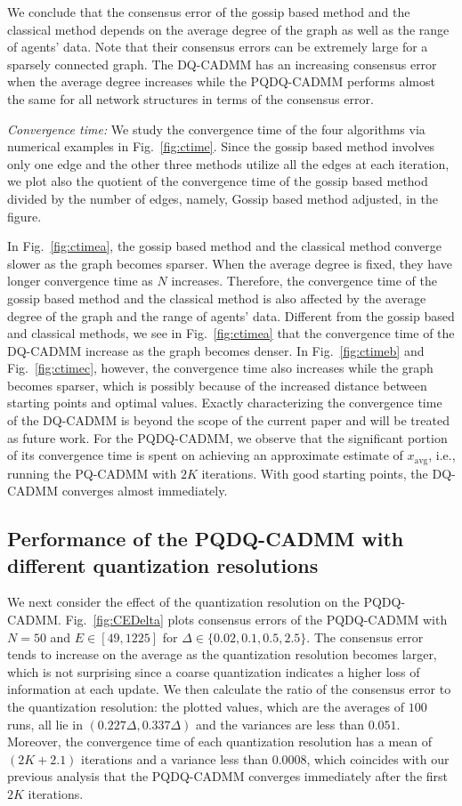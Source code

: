 \documentclass[journal]{IEEEtran}
\begin{document}
We conclude that the consensus error of the gossip based method and the classical method depends on the average degree of the graph as well as the range of agents' data. Note that their consensus errors can be extremely large for a sparsely connected graph. The DQ-CADMM has an increasing consensus error when the average degree increases while the PQDQ-CADMM performs almost the same for all network structures in terms of the consensus error. 

{\it Convergence time:} We study the convergence time of the four algorithms via numerical examples in Fig.~\ref{fig:ctime}. Since the gossip based method involves only one edge and the other three methods utilize all the edges at each iteration, we plot also the quotient of the convergence time of the gossip based method divided by the number of edges, namely, Gossip based method adjusted, in the figure. 

In Fig.~\ref{fig:ctimea}, the gossip based method and the classical method converge slower as the graph becomes sparser. When the average degree is fixed, they have longer convergence time as $N$ increases. Therefore, the convergence time of the gossip based method and the classical method is also affected by the average degree of the graph and the range of agents' data. Different from the gossip based and classical methods, we see in Fig.~\ref{fig:ctimea} that the convergence time of the DQ-CADMM increase as the graph becomes denser. In Fig.~\ref{fig:ctimeb} and Fig.~\ref{fig:ctimec}, however, the convergence time also increases while the graph becomes sparser, which is possibly because of the increased distance between starting points and optimal values. Exactly characterizing the convergence time of the DQ-CADMM is beyond the scope of the current paper and will be treated as future work. For the PQDQ-CADMM, we observe that the significant portion of its convergence time is spent on achieving an approximate estimate of $x_\text{avg}$, i.e., running the PQ-CADMM with $2K$ iterations. With good starting points, the DQ-CADMM converges almost immediately. 

\subsection{Performance of the PQDQ-CADMM with different quantization resolutions}
We next consider the effect of the quantization resolution on the PQDQ-CADMM. Fig.~\ref{fig:CEDelta} plots consensus errors of the PQDQ-CADMM with $N = 50$ and $E\in[49,1225]$ for $\Delta\in\{0.02, 0.1, 0.5, 2.5\}$. The consensus error tends to increase on the average as the quantization resolution becomes larger, which is not surprising since a coarse quantization indicates a higher loss of information at each update. We then calculate the ratio of the consensus error to the quantization resolution: the plotted values, which are the averages of $100$ runs, all lie in $(0.227\Delta, 0.337\Delta)$ and the variances are less than $0.051$. Moreover, the convergence time of each quantization resolution has a mean of $(2K+2.1)$ iterations and a variance less than $0.0008$, which coincides with our previous analysis that the PQDQ-CADMM converges immediately after the first $2K$ iterations.
\end{document}
